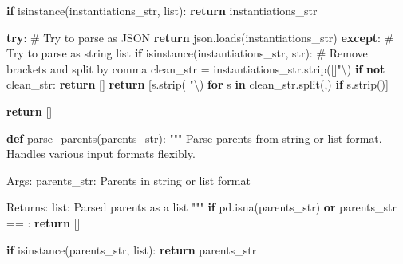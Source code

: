 \documentclass[
  11pt,
  letterpaper,
]{book}
\newenvironment{Shaded}{\begin{snugshade}}{\end{snugshade}}
\newcommand{\BuiltInTok}[1]{\textcolor[rgb]{0.00,0.23,0.31}{#1}}
\newcommand{\CharTok}[1]{\textcolor[rgb]{0.13,0.47,0.30}{#1}}
\newcommand{\CommentTok}[1]{\textcolor[rgb]{0.37,0.37,0.37}{#1}}
\newcommand{\ControlFlowTok}[1]{\textcolor[rgb]{0.00,0.23,0.31}{\textbf{#1}}}
\newcommand{\KeywordTok}[1]{\textcolor[rgb]{0.00,0.23,0.31}{\textbf{#1}}}
\newcommand{\NormalTok}[1]{\textcolor[rgb]{0.00,0.23,0.31}{#1}}
\newcommand{\OperatorTok}[1]{\textcolor[rgb]{0.37,0.37,0.37}{#1}}
\newcommand{\StringTok}[1]{\textcolor[rgb]{0.13,0.47,0.30}{#1}}
\begin{document}
\begin{Shaded}
\begin{Highlighting}[]
    \ControlFlowTok{if} \BuiltInTok{isinstance}\NormalTok{(instantiations\_str, }\BuiltInTok{list}\NormalTok{):}
        \ControlFlowTok{return}\NormalTok{ instantiations\_str}

    \ControlFlowTok{try}\NormalTok{:}
        \CommentTok{\# Try to parse as JSON}
        \ControlFlowTok{return}\NormalTok{ json.loads(instantiations\_str)}
    \ControlFlowTok{except}\NormalTok{:}
        \CommentTok{\# Try to parse as string list}
        \ControlFlowTok{if} \BuiltInTok{isinstance}\NormalTok{(instantiations\_str, }\BuiltInTok{str}\NormalTok{):}
            \CommentTok{\# Remove brackets and split by comma}
\NormalTok{            clean\_str }\OperatorTok{=}\NormalTok{ instantiations\_str.strip(}\StringTok{\textquotesingle{}[]"}\CharTok{\textbackslash{}\textquotesingle{}}\StringTok{\textquotesingle{}}\NormalTok{)}
            \ControlFlowTok{if} \KeywordTok{not}\NormalTok{ clean\_str:}
                \ControlFlowTok{return}\NormalTok{ []}
            \ControlFlowTok{return}\NormalTok{ [s.strip(}\StringTok{\textquotesingle{} "}\CharTok{\textbackslash{}\textquotesingle{}}\StringTok{\textquotesingle{}}\NormalTok{) }\ControlFlowTok{for}\NormalTok{ s }\KeywordTok{in}\NormalTok{ clean\_str.split(}\StringTok{\textquotesingle{},\textquotesingle{}}\NormalTok{) }\ControlFlowTok{if}\NormalTok{ s.strip()]}

    \ControlFlowTok{return}\NormalTok{ []}

\KeywordTok{def}\NormalTok{ parse\_parents(parents\_str):}
    \CommentTok{"""}
\CommentTok{    Parse parents from string or list format.}
\CommentTok{    Handles various input formats flexibly.}

\CommentTok{    Args:}
\CommentTok{        parents\_str: Parents in string or list format}

\CommentTok{    Returns:}
\CommentTok{        list: Parsed parents as a list}
\CommentTok{    """}
    \ControlFlowTok{if}\NormalTok{ pd.isna(parents\_str) }\KeywordTok{or}\NormalTok{ parents\_str }\OperatorTok{==} \StringTok{\textquotesingle{}\textquotesingle{}}\NormalTok{:}
        \ControlFlowTok{return}\NormalTok{ []}

    \ControlFlowTok{if} \BuiltInTok{isinstance}\NormalTok{(parents\_str, }\BuiltInTok{list}\NormalTok{):}
        \ControlFlowTok{return}\NormalTok{ parents\_str}


\end{Highlighting}
\end{Shaded}
\end{document}
